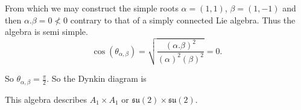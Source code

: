 \documentclass[main.tex]{subfiles}
\begin{document}
From which we may construct the simple roots $\alpha=(1,1)$, $\beta=(1,-1)$ and then $\alpha.\beta=0\nless0$ contrary to that of a simply connected Lie algebra. Thus the algebra is semi simple.
\begin{equation}
\cos{(\theta_{\alpha,\beta})}=\sqrt{\frac{(\alpha.\beta)^2}{(\alpha)^2(\beta)^2}}=0.
\end{equation}

So $\theta_{\alpha,\beta}=\frac{\pi}{2}$. So the Dynkin diagram is
\begin{figure}[H] 
\centering
\end{figure}
This algebra describes $A_1\times A_1$ or $\mathfrak{su}(2)\times\mathfrak{su}(2)$.
\end{document}
